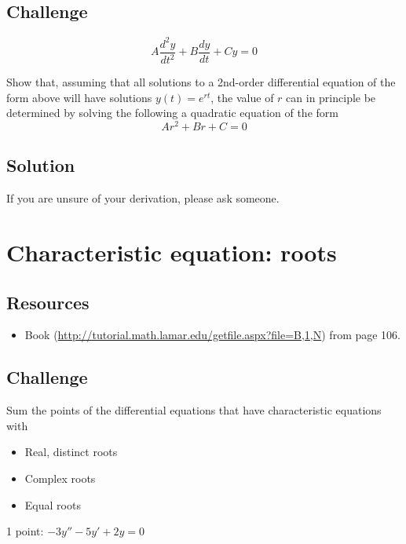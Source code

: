 \subsection*{Challenge}
\begin{equation}
    A \frac{d^2y}{dt^2} + B \frac{dy}{dt} + C y = 0
\end{equation}

Show that, assuming that all solutions to a 2nd-order differential equation of the form above will have solutions $y(t)=e^{rt}$, the value of $r$ can in principle be determined by solving the following a quadratic equation of the form
\begin{equation}
    A r^2 + Br + C = 0
\end{equation}

\subsection*{Solution}
If you are unsure of your derivation, please ask someone.




\newpage
\section{Characteristic equation: roots}

\subsection*{Resources}
\begin{itemize}
    \item Book (\url{http://tutorial.math.lamar.edu/getfile.aspx?file=B,1,N}) from page 106.
\end{itemize}

\subsection*{Challenge}
Sum the points of the differential equations that have characteristic equations with
\begin{itemize}
    \item Real, distinct roots
    \item Complex roots
    \item Equal roots
\end{itemize}

1 point: $\displaystyle -3 y'' - 5 y' + 2 y = 0$ %

